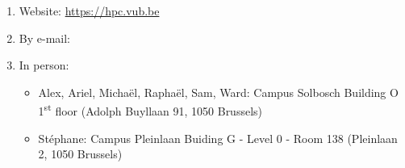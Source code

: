 \begin{enumerate}
\item  Website: \url{https://hpc.vub.be}
\item  By e-mail:  \hpcinfo
\item  In person:
\begin{itemize}
\item  Alex, Ariel, Micha\"el, Rapha\"el, Sam, Ward:
    Campus Solbosch Building O 1\textsuperscript{st} floor (Adolph Buyllaan 91, 1050 Brussels)
\item  St\'ephane:
    Campus Pleinlaan Buiding G - Level 0 - Room 138 (Pleinlaan 2, 1050 Brussels)
\end{itemize}
\end{enumerate}

